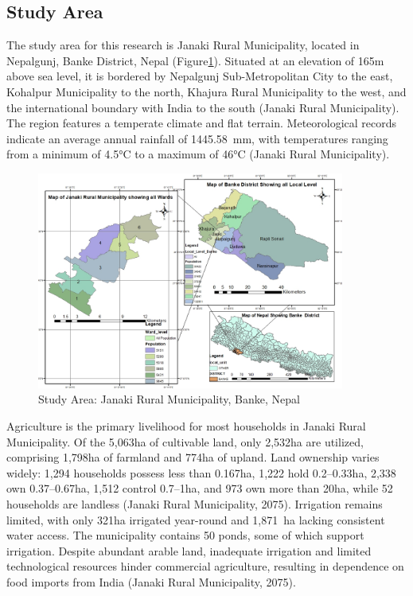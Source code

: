 \subsection{Study Area}



The study area for this research is Janaki Rural Municipality, located in Nepalgunj, Banke District, Nepal (Figure\ref{fig:study_area_map}). Situated at an elevation of 165m above sea level, it is bordered by Nepalgunj Sub-Metropolitan City to the east, Kohalpur Municipality to the north, Khajura Rural Municipality to the west, and the international boundary with India to the south (Janaki Rural Municipality). The region features a temperate climate and flat terrain. Meteorological records indicate an average annual rainfall of 1445.58~mm, with temperatures ranging from a minimum of 4.5°C to a maximum of 46°C (Janaki Rural Municipality).
\begin{figure}[H]
    \centering
    \caption{Study Area: Janaki Rural Municipality, Banke, Nepal} 
    \label{fig:study_area_map}
    \includegraphics[width=0.9\textwidth]{images/study_area_map.png}
\end{figure}

Agriculture is the primary livelihood for most households in Janaki Rural Municipality. Of the 5,063ha of cultivable land, only 2,532ha are utilized, comprising 1,798ha of farmland and 774ha of upland. Land ownership varies widely: 1,294 households possess less than 0.167ha, 1,222 hold 0.2--0.33ha, 2,338 own 0.37--0.67ha, 1,512 control 0.7--1ha, and 973 own more than 20ha, while 52 households are landless (Janaki Rural Municipality, 2075). Irrigation remains limited, with only 321ha irrigated year-round and 1,871~ha lacking consistent water access. The municipality contains 50 ponds, some of which support irrigation. Despite abundant arable land, inadequate irrigation and limited technological resources hinder commercial agriculture, resulting in dependence on food imports from India (Janaki Rural Municipality, 2075).
    
